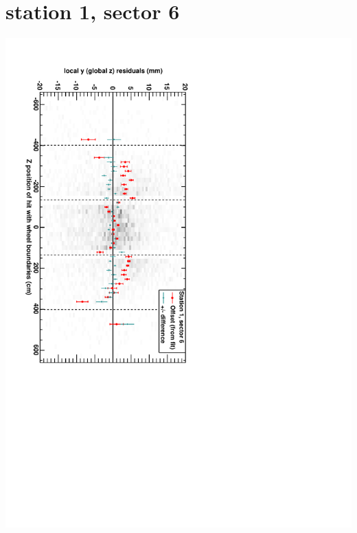 \documentclass[compress]{beamer}
\begin{document}
\section*{station 1, sector 6}
\begin{frame} \vfill \mbox{\hspace{-1 cm}\includegraphics[height=1.2\linewidth, angle=90]{DTzVsZ_st1_sr06.pdf}} \end{frame}
\end{document}

